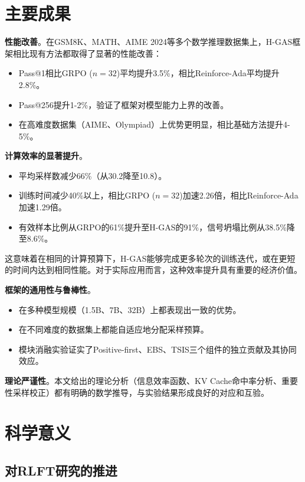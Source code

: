 \section{主要成果}
\label{sec:main_contributions}

\textbf{性能改善}。在GSM8K、MATH、AIME 2024等多个数学推理数据集上，H-GAS框架相比现有方法都取得了显著的性能改善：
\begin{itemize}
    \item Pass@1相比GRPO ($n=32$)平均提升3.5\%，相比Reinforce-Ada平均提升2.8\%。
    \item Pass@256提升1-2\%，验证了框架对模型能力上界的改善。
    \item 在高难度数据集（AIME、Olympiad）上优势更明显，相比基础方法提升4-5\%。
\end{itemize}

\textbf{计算效率的显著提升}。
\begin{itemize}
    \item 平均采样数减少66\%（从30.2降至10.8）。
    \item 训练时间减少40\%以上，相比GRPO ($n=32$)加速2.26倍，相比Reinforce-Ada加速1.29倍。
    \item 有效样本比例从GRPO的61\%提升至H-GAS的91\%，信号坍塌比例从38.5\%降至8.6\%。
\end{itemize}

这意味着在相同的计算预算下，H-GAS能够完成更多轮次的训练迭代，或在更短的时间内达到相同性能。对于实际应用而言，这种效率提升具有重要的经济价值。

\textbf{框架的通用性与鲁棒性}。
\begin{itemize}
    \item 在多种模型规模（1.5B、7B、32B）上都表现出一致的优势。
    \item 在不同难度的数据集上都能自适应地分配采样预算。
    \item 模块消融实验证实了Positive-first、EBS、TSIS三个组件的独立贡献及其协同效应。
\end{itemize}

\textbf{理论严谨性}。本文给出的理论分析（信息效率函数、KV Cache命中率分析、重要性采样校正）都有明确的数学推导，与实验结果形成良好的对应和互验。

\section{科学意义}
\label{sec:scientific_significance}

\subsection{对RLFT研究的推进}
\label{subsec:advance_to_rlft}

